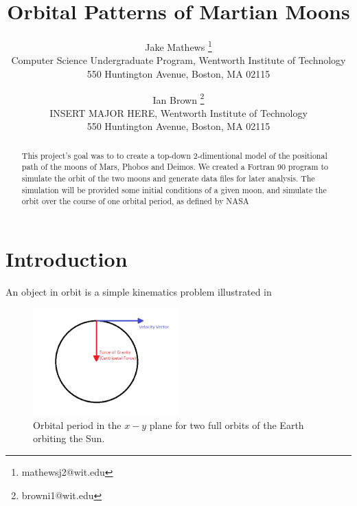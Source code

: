 \documentclass[11pt]{article}
\begin{document}
\title{\textbf{Orbital Patterns of Martian Moons}}

\author{Jake Mathews
\thanks{mathewsj2@wit.edu}\\
Computer Science Undergraduate Program, Wentworth Institute of Technology\\
550 Huntington Avenue, Boston, MA 02115\\
\and Ian Brown
\thanks{browni1@wit.edu}\\
INSERT MAJOR HERE, Wentworth Institute of Technology\\
550 Huntington Avenue, Boston, MA 02115}

\maketitle

\begin{abstract}

This project's goal was to to create a top-down 2-dimentional model
of the positional path of the moons of Mars, Phobos and Deimos.
We created a Fortran 90 program to simulate the orbit of the two moons
and generate data files for later analysis.
The simulation will be provided some initial conditions of a given moon,
and simulate the orbit over the course of one orbital period, as defined
by NASA~\cite{nasa}

\end{abstract}

\section{Introduction}
An object in orbit is a simple kinematics problem illustrated in 

\begin{figure}[ht]
  \centering
  \includegraphics[width=0.5\textwidth, angle =0]{../presentation/orbitalDiagram}
  \caption{Orbital period in the $x-y$ plane for two full orbits of the Earth orbiting the Sun.}
  \label{fig:centripital}
\end{figure}
\end{document}
